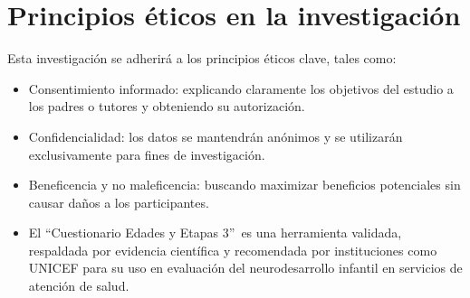 \documentclass[11pt,letterpaper]{report}
\newcommand{\asq}{“Cuestionario Edades y Etapas 3”}
\begin{document}
\section{Principios éticos en la investigación}
Esta investigación se adherirá a los principios éticos clave, tales como:
\begin{itemize}
	\item Consentimiento informado: explicando claramente los objetivos del
	estudio a los padres o tutores y obteniendo su autorización.

	\item Confidencialidad: los datos se mantendrán anónimos y se utilizarán 
	exclusivamente para fines de investigación.

	\item Beneficencia y no maleficencia: buscando maximizar beneficios
	potenciales sin causar daños a los participantes.

	\item El \asq\ es una herramienta validada, respaldada por evidencia
	científica y recomendada por instituciones como UNICEF para su uso en
	evaluación del neurodesarrollo infantil en servicios de atención de
	salud. \cite{UNICEFrespaldo}
\end{itemize}

\printbibliography
\end{document}
